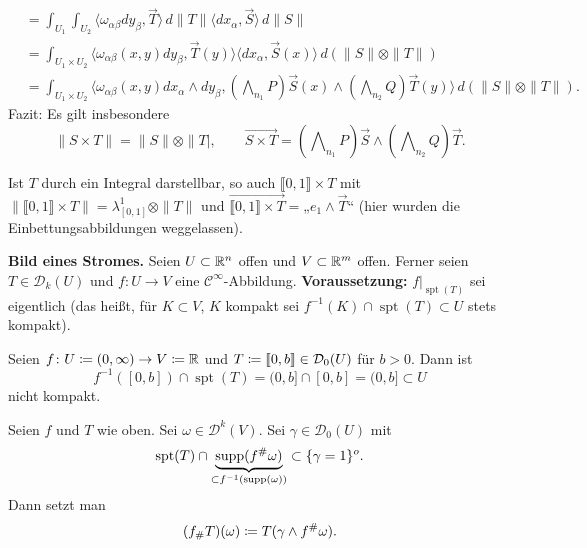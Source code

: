 \documentclass[a4paper,twoside,DIV15,BCOR12mm]{scrbook}
\newcommand{\bw}{\bigwedge\nolimits}
\DeclareMathOperator{\spt}{spt}
\newcommand{\overarrow}{\overrightarrow}
\begin{document}
\begin{beweis}
\begin{enumerate}
\begin{align*}
&= \int_{U_1}\int_{U_2} \langle \omega_{\alpha\beta}dy_\beta,\overarrow T\rangle \, d\|T\| \langle dx_\alpha, \overarrow S\rangle \, d\|S\| \\
&= \int_{U_1\times U_2} \langle \omega_{\alpha\beta}(x,y) dy_\beta, \overarrow T(y)\rangle \langle dx_\alpha,\overarrow S(x)\rangle \, d(\|S\| \otimes \|T\|) \\
&= \int_{U_1\times U_2} \langle \omega_{\alpha\beta}(x,y) dx_\alpha\wedge dy_\beta, (\bw_{n_1}P) \overarrow S(x)\wedge (\bw_{n_2}Q)\overarrow T(y)\rangle \, d(\|S\| \otimes \|T\|).
\end{align*}
Fazit: Es gilt insbesondere
$$\|S\times T\| = \|S\|\otimes \|T|,\qquad \overarrow {S\times T} = (\bw_{n_1}P) \overarrow S\wedge (\bw_{n_2}Q)\overarrow T.$$ 
\end{enumerate}
\end{beweis}

\begin{beispiel}
Ist $T$ durch ein Integral darstellbar, so auch $\llbracket 0, 1\rrbracket \times T$ mit $\| \llbracket 0,1\rrbracket \times T\| = \lambda^1_{[0,1]} \otimes \|T\|$ und $\overarrow {\llbracket 0,1\rrbracket \times T} = $„$e_1\wedge \overarrow T$“ (hier wurden die Einbettungsabbildungen weggelassen).
\end{beispiel}

\textbf{Bild eines Stromes.} Seien $U\subset \mathbb{R}^n$ offen und $V\subset\mathbb{R}^m$ offen. Ferner seien $T\in \mathcal D_k(U)$ und $f\colon U\to V$ eine $\mathcal C^{\infty}$-Abbildung. \textbf{Voraussetzung:} $f|_{\spt(T)}$ sei eigentlich (das heißt, für $K\subset V$, $K$ kompakt sei $f^{-1}(K)\cap \spt(T)\subset U$ stets kompakt).

\begin{beispiel}
Seien $f\colon U\da (0,\infty) \to V\da \MdR$ und $T\da \llbracket 0,b\rrbracket \in \mathcal D_0(U)$ für $b> 0$. Dann ist
\[
f^{-1}([0,b])\cap \spt(T) = (0,b] \cap [0,b] = (0,b] \subset U
\]
nicht kompakt.
\end{beispiel}

\begin{definition}
Seien $f$ und $T$ wie oben. Sei $\omega  \in \mathcal D^k(V)$. Sei $\gamma\in\mathcal D_0(U)$ mit 
\[
\spt(T) \cap \underbrace{\supp(f^\#\omega)}_{\subset f^{-1}(\supp(\omega))} \subset \{\gamma=1\}^o.
\]
Dann setzt man
\[
(f_\# T) (\omega) \da T(\gamma \wedge f^\#\omega).
\]
\end{definition}
\end{document}
